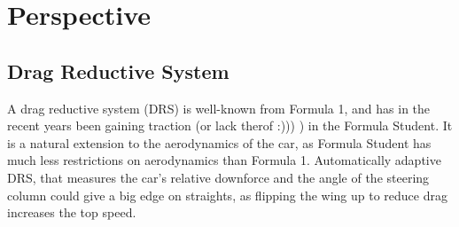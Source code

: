 \chapter*{Perspective}

\section{Drag Reductive System}

A drag reductive system (DRS) is well-known from Formula 1, and has in the recent years been gaining traction (or lack therof :))) ) in the Formula Student. It is a natural extension to the aerodynamics of the car, as Formula Student has much less restrictions on aerodynamics than Formula 1. Automatically adaptive DRS, that measures the car's relative downforce and the angle of the steering column could give a big edge on straights, as flipping the wing up to reduce drag increases the top speed. 
